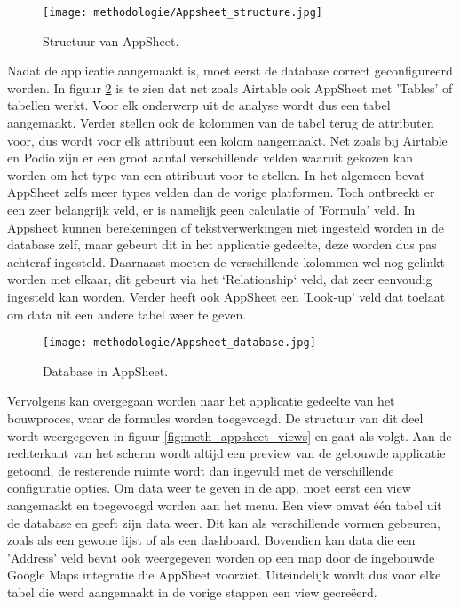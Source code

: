 \begin{figure}[ht]
    \centering
    \texttt{[image: methodologie/Appsheet\_structure.jpg]}
    \caption{Structuur van AppSheet.}
    \label{fig:meth_appsheet_structuur}
\end{figure}

Nadat de applicatie aangemaakt is, moet eerst de database correct geconfigureerd worden. In figuur \ref{fig:meth_appsheet_database} is te zien dat net zoals Airtable ook AppSheet met 'Tables' of tabellen werkt. Voor elk onderwerp uit de analyse wordt dus een tabel aangemaakt. Verder stellen ook de kolommen van de tabel terug de attributen voor, dus wordt voor elk attribuut een kolom aangemaakt. Net zoals bij Airtable en Podio zijn er een groot aantal verschillende velden waaruit gekozen kan worden om het type van een attribuut voor te stellen. In het algemeen bevat AppSheet zelfs meer types velden dan de vorige platformen. Toch ontbreekt er een zeer belangrijk veld, er is namelijk geen calculatie of 'Formula' veld. In Appsheet kunnen berekeningen of tekstverwerkingen niet ingesteld worden in de database zelf, maar gebeurt dit in het applicatie gedeelte, deze worden dus pas achteraf ingesteld. Daarnaast moeten de verschillende kolommen wel nog gelinkt worden met elkaar, dit gebeurt via het `Relationship` veld, dat zeer eenvoudig ingesteld kan worden. Verder heeft ook AppSheet een 'Look-up' veld dat toelaat om data uit een andere tabel weer te geven.

\begin{figure}[ht]
    \centering
    \texttt{[image: methodologie/Appsheet\_database.jpg]}
    \caption{Database in AppSheet.}
    \label{fig:meth_appsheet_database}
\end{figure}

Vervolgens kan overgegaan worden naar het applicatie gedeelte van het bouwproces, waar de formules worden toegevoegd. De structuur van dit deel wordt weergegeven in figuur \ref{fig:meth_appsheet_views} en gaat als volgt. Aan de rechterkant van het scherm wordt altijd een preview van de gebouwde applicatie getoond, de resterende ruimte wordt dan ingevuld met de verschillende configuratie opties. Om data weer te geven in de app, moet eerst een view aangemaakt en toegevoegd worden aan het menu. Een view omvat één tabel uit de database en geeft zijn data weer. Dit kan als verschillende vormen gebeuren, zoals als een gewone lijst of als een dashboard. Bovendien kan data die een 'Address' veld bevat ook weergegeven worden op een map door de ingebouwde Google Maps integratie die AppSheet voorziet. Uiteindelijk wordt dus voor elke tabel die werd aangemaakt in de vorige stappen een view gecreëerd. \\

